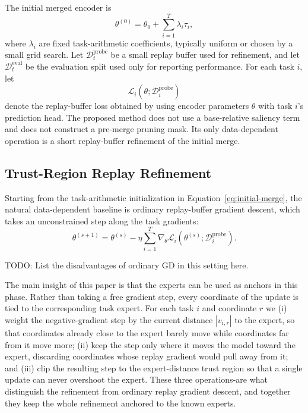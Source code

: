 \documentclass[11pt]{article}
\newcommand{\thetab}{\theta_0}
\newcommand{\taskvec}{\tau}
\newcommand{\loss}{\mathcal{L}}
\newcommand{\data}{\mathcal{D}}
\begin{document}
The initial merged encoder is
\begin{equation}
    \theta^{(0)} = \thetab + \sum_{i=1}^{T}\lambda_i\taskvec_i,
    \label{eq:initial-merge}
\end{equation}
where $\lambda_i$ are fixed task-arithmetic coefficients, typically uniform or chosen by a small grid search. Let $\data_t^{\mathrm{probe}}$ be a small replay buffer used for refinement, and let $\data_t^{\mathrm{eval}}$ be the evaluation split used only for reporting performance. For each task $i$, let
\begin{equation}
    \loss_i(\theta;\data_i^{\mathrm{probe}})
    \label{eq:task-loss}
\end{equation}
denote the replay-buffer loss obtained by using encoder parameters $\theta$ with task $i$'s prediction head.
The proposed method does not use a base-relative saliency term and does not construct a pre-merge pruning mask. Its only data-dependent operation is a short replay-buffer refinement of the initial merge.






\subsection{Trust-Region Replay Refinement}
\label{sec:replay-refinement}
Starting from the task-arithmetic initialization in Equation~\eqref{eq:initial-merge}, the natural data-dependent baseline is ordinary replay-buffer gradient descent, which takes an unconstrained step along the task gradients:
\begin{equation}
    \theta^{(s+1)}
    =
    \theta^{(s)}
    -
    \eta \sum_{i=1}^{T}
    \nabla_\theta \loss_i(\theta^{(s)};\data_i^{\mathrm{probe}}).
    \label{eq:naive-replay-gd}
\end{equation}

TODO: List the disadvantages of ordinary GD in this setting here.

The main insight of this paper is that the experts can be used as anchors in this phase.
Rather than taking a free gradient step, every coordinate of the update is tied to the corresponding task expert. For each task $i$ and coordinate $r$ we (i) weight the negative-gradient step by the current distance $|v_{i,r}|$ to the expert, so that coordinates already close to the expert barely move while coordinates far from it move more; (ii) keep the step only where it moves the model toward the expert, discarding coordinates whose replay gradient would pull away from it; and (iii) clip the resulting step to the expert-distance trust region so that a single update can never overshoot the expert. These three operations-are what distinguish the refinement from ordinary replay gradient descent, and together they keep the whole refinement anchored to the known experts.
\end{document}
